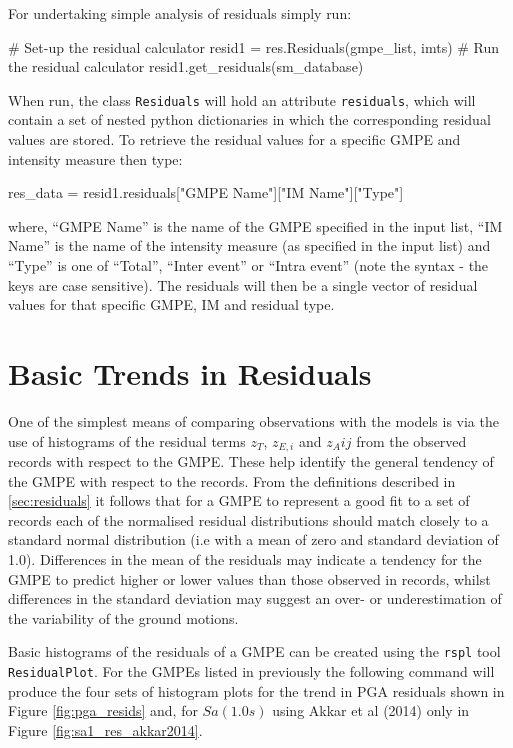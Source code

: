 For undertaking simple analysis of residuals simply run:

\begin{python}[frame=single]
# Set-up the residual calculator
resid1 = res.Residuals(gmpe_list, imts)
# Run the residual calculator
resid1.get_residuals(sm_database)
\end{python}

When run, the class \verb=Residuals= will hold an attribute \verb=residuals=, which will contain a set of nested python dictionaries in which the corresponding residual values are stored. To retrieve the residual values for a specific GMPE and intensity measure then type:

\begin{python}
res_data = resid1.residuals["GMPE Name"]["IM Name"]["Type"]
\end{python}

where, ``GMPE Name'' is the name of the GMPE specified in the input list, ``IM Name'' is the name of the intensity measure (as specified in the input list) and ``Type'' is one of ``Total'', ``Inter event'' or ``Intra event'' (note the syntax - the keys are case sensitive). The residuals will then be a single vector of residual values for that specific GMPE, IM and residual type.
  

\section{Basic Trends in Residuals}
\label{sec:residual_trends}

One of the simplest means of comparing observations with the models is via the use of histograms of the residual terms $z_T$, $z_{E, i}$ and $z_A{ij}$ from the observed records with respect to the GMPE. These help identify the general tendency of the GMPE with respect to the records. From the definitions described in \ref{sec:residuals} it follows that for a GMPE to represent a good fit to a set of records each of the normalised residual distributions should match closely to a standard normal distribution (i.e with a mean of zero and standard deviation of 1.0). Differences in the mean of the residuals may indicate a tendency for the GMPE to predict higher or lower values than those observed in records, whilst differences in the standard deviation may suggest an over- or underestimation of the variability of the ground motions.

Basic histograms of the residuals of a GMPE can be created using the \verb=rspl= tool \verb=ResidualPlot=. For the GMPEs listed in previously the following command will produce the four sets of histogram plots for the trend in PGA residuals shown in Figure \ref{fig:pga_resids} and, for $Sa \left( {1.0 s} \right)$ using Akkar et al (2014) only in Figure \ref{fig:sa1_res_akkar2014}.

